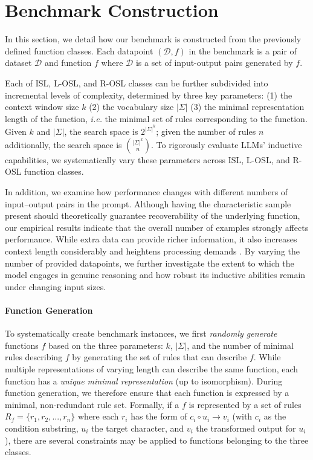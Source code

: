 \section{Benchmark Construction} 
In this section, we detail how our benchmark is constructed from the previously defined function classes. Each datapoint $(\mathcal{D}, f)$ in the benchmark is a pair of dataset $\mathcal{D}$ and function $f$ where $\mathcal{D}$ is a set of input-output pairs generated by $f$.

Each of ISL, L-OSL, and R-OSL classes can be further subdivided into incremental levels of complexity, determined by three key parameters: (1) the context window size $k$ (2) the vocabulary size $|\Sigma|$ (3) the minimal representation length of the function, \emph{i.e.} the minimal set of rules corresponding to the function. Given $k$ and $|\Sigma|$, the search space is $2^{|\Sigma|^k}$; given the number of rules $n$ additionally, the search space is $|\Sigma|^k \choose n$. To rigorously evaluate LLMs' inductive capabilities, we systematically vary these parameters across ISL, L-OSL, and R-OSL function classes.

In addition, we examine how performance changes with different numbers of input–output pairs in the prompt. Although having the characteristic sample present should theoretically guarantee recoverability of the underlying function, our empirical results indicate that the overall number of examples strongly affects performance. While extra data can provide richer information, it also increases context length considerably and heightens processing demands \citep{li2024long}. By varying the number of provided datapoints, we further investigate the extent to which the model engages in genuine reasoning and how robust its inductive abilities remain under changing input sizes.

\paragraph{Function Generation}
To systematically create benchmark instances, we first \emph{randomly generate} functions $f$ based on the three parameters: $k$, $|\Sigma|$, and the number of minimal rules describing $f$ by generating the set of rules that can describe $f$. While multiple representations of varying length can describe the same function, each function has a \emph{unique minimal representation} (up to isomorphism). During function generation, we therefore ensure that each function is expressed by a minimal, non-redundant rule set. Formally, if a $f$ is represented by a set of rules $R_f = \{r_1, r_2, ..., r_n\}$ where each $r_i$ has the form of $c_i\circ u_i\to v_i$ (with $c_i$ as the condition substring, $u_i$ the target character, and $v_i$ the transformed output for $u_i$), there are several constraints may be applied to functions belonging to the three classes. 

